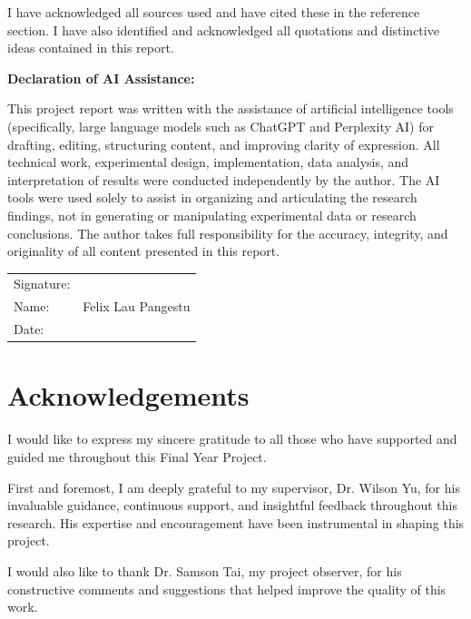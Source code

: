 \documentclass[12pt,a4paper]{report}
\begin{document}
I have acknowledged all sources used and have cited these in the reference section. I have also identified and acknowledged all quotations and distinctive ideas contained in this report.

\vspace{1cm}

\textbf{Declaration of AI Assistance:}

This project report was written with the assistance of artificial intelligence tools (specifically, large language models such as ChatGPT and Perplexity AI) for drafting, editing, structuring content, and improving clarity of expression. All technical work, experimental design, implementation, data analysis, and interpretation of results were conducted independently by the author. The AI tools were used solely to assist in organizing and articulating the research findings, not in generating or manipulating experimental data or research conclusions. The author takes full responsibility for the accuracy, integrity, and originality of all content presented in this report.

\vspace{2cm}

\noindent
\begin{tabular}{@{}ll}
Signature: & \underline{\hspace{5cm}} \\[1cm]
Name: & Felix Lau Pangestu \\[0.5cm]
Date: & \underline{\hspace{5cm}} \\
\end{tabular}

\clearpage

\chapter*{Acknowledgements}

I would like to express my sincere gratitude to all those who have supported and guided me throughout this Final Year Project.

First and foremost, I am deeply grateful to my supervisor, Dr. Wilson Yu, for his invaluable guidance, continuous support, and insightful feedback throughout this research. His expertise and encouragement have been instrumental in shaping this project.

I would also like to thank Dr. Samson Tai, my project observer, for his constructive comments and suggestions that helped improve the quality of this work.
\end{document}
